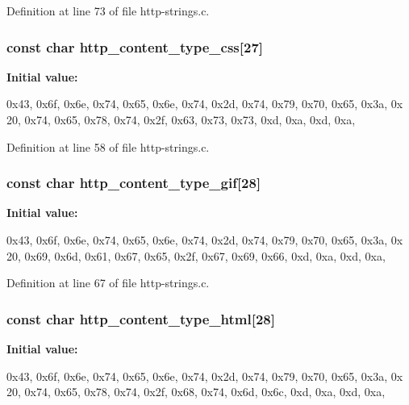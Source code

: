 Definition at line 73 of file http-\/strings.c.

\hypertarget{http-strings_8c_a5475ca39ad42a7477a35e10e34697775}{
\subsubsection[{http\_\-content\_\-type\_\-css}]{\setlength{\rightskip}{0pt plus 5cm}const char {\bf http\_\-content\_\-type\_\-css}\mbox{[}27\mbox{]}}}
\label{http-strings_8c_a5475ca39ad42a7477a35e10e34697775}
{\bfseries Initial value:}
\begin{DoxyCode}
 

{0x43, 0x6f, 0x6e, 0x74, 0x65, 0x6e, 0x74, 0x2d, 0x74, 0x79, 0x70, 0x65, 0x3a, 0x
      20, 0x74, 0x65, 0x78, 0x74, 0x2f, 0x63, 0x73, 0x73, 0xd, 0xa, 0xd, 0xa, }
\end{DoxyCode}


Definition at line 58 of file http-\/strings.c.

\hypertarget{http-strings_8c_aef053704ad19e807a1f0f19cb060f3c6}{
\subsubsection[{http\_\-content\_\-type\_\-gif}]{\setlength{\rightskip}{0pt plus 5cm}const char {\bf http\_\-content\_\-type\_\-gif}\mbox{[}28\mbox{]}}}
\label{http-strings_8c_aef053704ad19e807a1f0f19cb060f3c6}
{\bfseries Initial value:}
\begin{DoxyCode}
 

{0x43, 0x6f, 0x6e, 0x74, 0x65, 0x6e, 0x74, 0x2d, 0x74, 0x79, 0x70, 0x65, 0x3a, 0x
      20, 0x69, 0x6d, 0x61, 0x67, 0x65, 0x2f, 0x67, 0x69, 0x66, 0xd, 0xa, 0xd, 0xa, }
\end{DoxyCode}


Definition at line 67 of file http-\/strings.c.

\hypertarget{http-strings_8c_a9067d0f43f75f731ec8b6cf5bc937b46}{
\subsubsection[{http\_\-content\_\-type\_\-html}]{\setlength{\rightskip}{0pt plus 5cm}const char {\bf http\_\-content\_\-type\_\-html}\mbox{[}28\mbox{]}}}
\label{http-strings_8c_a9067d0f43f75f731ec8b6cf5bc937b46}
{\bfseries Initial value:}
\begin{DoxyCode}
 

{0x43, 0x6f, 0x6e, 0x74, 0x65, 0x6e, 0x74, 0x2d, 0x74, 0x79, 0x70, 0x65, 0x3a, 0x
      20, 0x74, 0x65, 0x78, 0x74, 0x2f, 0x68, 0x74, 0x6d, 0x6c, 0xd, 0xa, 0xd, 0xa, }
\end{DoxyCode}


